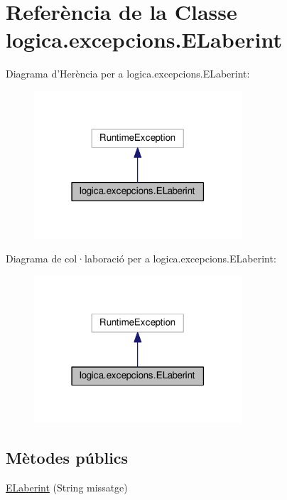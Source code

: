 \hypertarget{classlogica_1_1excepcions_1_1_e_laberint}{\section{Referència de la Classe logica.\+excepcions.\+E\+Laberint}
\label{classlogica_1_1excepcions_1_1_e_laberint}
}


Diagrama d'Herència per a logica.\+excepcions.\+E\+Laberint\+:
\nopagebreak
\begin{figure}[H]
\begin{center}
\leavevmode
\includegraphics[width=219pt]{classlogica_1_1excepcions_1_1_e_laberint__inherit__graph}
\end{center}
\end{figure}


Diagrama de col·laboració per a logica.\+excepcions.\+E\+Laberint\+:
\nopagebreak
\begin{figure}[H]
\begin{center}
\leavevmode
\includegraphics[width=219pt]{classlogica_1_1excepcions_1_1_e_laberint__coll__graph}
\end{center}
\end{figure}
\subsection*{Mètodes públics}
\begin{DoxyCompactItemize}
\item 
\hyperlink{classlogica_1_1excepcions_1_1_e_laberint_a351544cabefcda88ba9b90f035542f91}{E\+Laberint} (String missatge)
\end{DoxyCompactItemize}


